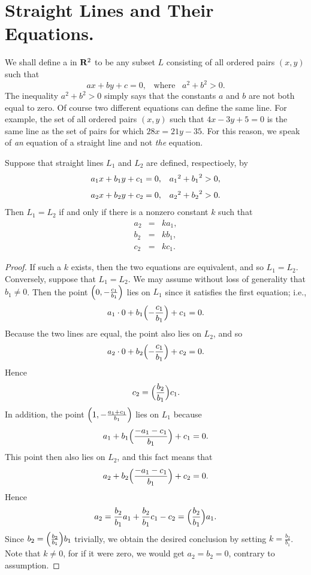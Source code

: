 \section{Straight Lines and Their Equations.}\label{sec 1.5}
We shall define a  in $\mathrm{\bf R}^2$ to be any subset $L$
consisting of all ordered pairs $(x, y)$
such that
\begin{equation}
 ax + by + c = 0, \;\;\; \mbox{where} \;\;\; a^2 + b^2 > 0.
\label{eq1.5.0}
\end{equation}
The inequality $a^2 + b^2 > 0$
simply says that the constants $a$ and $b$ are not both equal to zero.
Of course two different equations can define the same line.
For example, the set of all ordered pairs $(x, y)$
such that $4x - 3y + 5 = 0$ is the same line as the set of pairs for which $28x = 21y - 35$.
For this reason,
we speak of \emph{an} equation of a straight line
and not \emph{the} equation.

\begin{prop}\label{thm 1.5.1}
Suppose that straight lines $L_1$ and $L_2$ are defined, respectioely, by
\[
\begin{array}{ll}
a_{1}x + b_{1}y + c_1 = 0,  & {a_1}^2 + {b_1}^2 > 0,\vspace{.1in}\\
a_{2}x + b_{2}y + c_2 = 0,  & {a_2}^2 + {b_2}^2 > 0.
\end{array}
\]
Then $L_{1} = L_{2}$ if and only if there is a nonzero constant $k$
such that
\begin{eqnarray*}
a_2 &=& ka_{1}, \\
b_2 &=& kb_{1}, \\
c_2 &=& kc_{1}.
\end{eqnarray*}
\end{prop}

\begin{proof}
If such a $k$ exists,
then the two equations are equivalent, and so $L_1 = L_2$.
Conversely, suppose that $L_1 = L_2$.
We may assume without loss of generality that $b_{1} \neq 0$.
Then the point $\Bigl(0, -\frac{c_1}{b_1} \Bigr)$ lies on $L_1$ since it satisfies the first equation; i.e.,
\[
a_{1} \cdot 0  + b_{1} \Bigl(- \frac{c_1}{b_1} \Bigr) + c_{1} = 0.
\]
Because the two lines are equal, the point also lies on $L_2$, and so
\[
a_2 \cdot 0 + b_2 \Bigl( - \frac{c_1}{b_1} \Bigr) + c_2 = 0.
\]
Hence
\[
c_2 = \Bigl( \frac{b_2}{b_1} \Bigr) c_1.
\]
In addition, the point $\Bigl(1, - \frac{a_1 + c_1}{b_1} \Bigr)$
lies on $L_1$ because
\[
a_1 + b_{1} \Bigl( \frac{- a_1 - c_1}{ b_1} \Bigr) + c_1 = 0.
\]
This point then also lies on $L_2$, and this fact means that
\[
a_2 + b_{2} \Bigl(\frac{- a_1 - c_1}{b_1} \Bigr) + c_2 = 0.
\]
Hence
\[
a_2 = {\frac{b_2}{b_1}} a_{1} + {\frac{b_2}{b_1}} c_1 - c_2
= \Bigl( \frac{b_2}{b_1} \Bigr) a_{1}.
\]
Since $b_2 = \Bigl( \frac{b_2}{b_1} \Bigr) b_1$ trivially,
we obtain the desired conclusion by setting $k = \frac{b_2}{b_1}$.
Note that $k \neq 0$, for if it were zero,
we would get $a_2 = b_2 = 0$,
contrary to assumption.
\end{proof}

